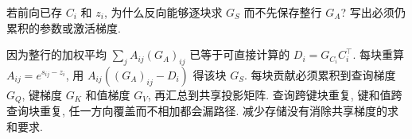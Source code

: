 \begin{exercise}
若前向已存 $C_i$ 和 $z_i$, 为什么反向能够逐块求 $G_S$ 而不先保存整行 $G_A$? 写出必须仍累积的参数或激活梯度.
\end{exercise}
\begin{solution}
因为整行的加权平均 $\sum_jA_{ij}(G_A)_{ij}$ 已等于可直接计算的 $D_i=G_{C_i}C_i^\top$. 每块重算 $A_{ij}=e^{s_{ij}-z_i}$, 用 $A_{ij}((G_A)_{ij}-D_i)$ 得该块 $G_S$. 每块贡献必须累积到查询梯度 $G_Q$, 键梯度 $G_K$ 和值梯度 $G_V$, 再汇总到共享投影矩阵. 查询跨键块重复, 键和值跨查询块重复, 任一方向覆盖而不相加都会漏路径. 减少存储没有消除共享梯度的求和要求.
\end{solution}
\label{ch:end:07}
